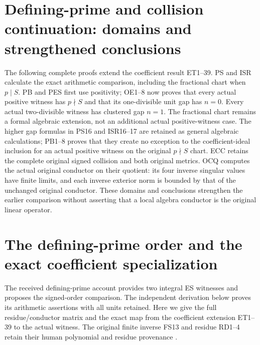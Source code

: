 \documentclass[11pt]{article}
\begin{document}
\section{Defining-prime and collision continuation: domains and strengthened conclusions}
The following complete proofs extend the coefficient result ET1--39.
PS and ISR calculate the exact arithmetic comparison, including the
fractional chart when $p\mid S$. PB and PES first use positivity;
OE1--8 now proves that every actual positive witness has $p\nmid S$
and that its one-divisible unit gap has $n=0$. Every actual two-divisible
witness has clustered gap $n=1$. The fractional chart remains a formal
algebraic extension, not an additional actual positive-witness case. The higher gap formulas in PS16 and ISR16--17 are
retained as general algebraic calculations; PB1--8 proves that they
create no exception to the coefficient-ideal inclusion for an actual
positive witness on the original $p\nmid S$ chart.
ECC retains the complete original signed collision and both original
metrics. OCQ computes the actual original conductor on their quotient:
its four inverse singular values have finite limits, and each inverse
exterior norm is bounded by that of the unchanged original conductor.
These domains and conclusions strengthen the earlier comparison without
asserting that a local algebra conductor is the original linear operator.

\section{The defining-prime order and the exact coefficient specialization}
The received defining-prime account \cite[eqs.\ (9)--(31)]{DefiningPrimeReceived}
provides two integral ES witnesses and proposes the signed-order comparison.
The independent derivation below proves its arithmetic assertions with all
units retained. Here we give the full residue/conductor matrix and the exact
map from the coefficient extension ET1--39 to the actual witness. The
original finite inverse FS13 and residue RD1--4 retain their human
polynomial and residue provenance \cite{ES488,Tao,JouveRV}.
\end{document}
